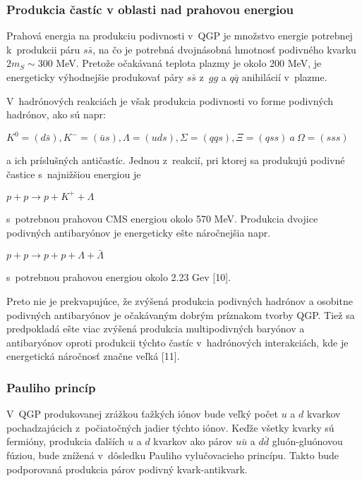 \subsubsection{Produkcia častíc v oblasti nad prahovou energiou}
Prahová energia na produkciu podivnosti v~QGP je množstvo
energie potrebnej k~produkcii páru $s\bar{s}$, na čo je potrebná
dvojnásobná  hmotnosť podivného kvarku $2m_{S} \sim 300$ MeV.
Pretože očakávaná teplota plazmy je okolo 200 MeV, je
energeticky výhodnejšie produkovať páry $s\bar{s}$ z~$gg$ a
$q\bar{q}$ anihilácií v~plazme.

V~hadrónových reakciách je však produkcia podivnosti vo forme
podivných hadrónov, ako sú napr:
\begin{center}
  $ K^{0}=(d\bar{s}), K^{-}=(\bar{u}s), \Lambda=(uds), \Sigma=(qqs),
  \Xi=(qss) \: a \: \Omega=(sss)$
\end{center}
a ich  príslušných antičastíc. Jednou z~reakcií, pri
ktorej sa
pro\-du\-ku\-jú po\-di\-vné častice s~najnižšiou energiou
je
\begin{center}
  $p + p \longrightarrow p + K^{+} + \Lambda$
\end{center}
s~potrebnou prahovou CMS energiou okolo 570 MeV. Produkcia dvojice
podivných anti\-ba\-ryónov je energeticky ešte
náročnejšia napr.
\begin{center}
  $p + p \longrightarrow p + p + \Lambda + \bar{\Lambda}$
\end{center}
s~potrebnou prahovou energiou okolo 2.23 Gev [10].

Preto nie je prekvapujúce, že zvýšená produkcia podivných
hadrónov a osobitne podivných antibaryónov je očakávaným
dobrým príznakom tvorby QGP. Tiež sa predpokladá ešte viac
zvýšená produkcia multipodivných baryónov a antibaryónov oproti
produkcii týchto častíc v~hadrónových interakciách, kde je
energetická náročnosť značne veľká [11].

\subsubsection{Pauliho princíp}
V~QGP produkovanej zrážkou ťažkých iónov bude
veľký počet $u$ a $d$ kvarkov pochadzajúcich
z~počiatočných jadier týchto iónov. Keďže všetky kvarky sú
fermióny, produkcia ďalších $u$ a $d$ kvarkov ako párov
$u\bar{u}$ a $d\bar{d}$ gluón-gluónovou fúziou, bude znížená
v~dôsledku Pauliho vylučovacieho princípu. Takto bude
podporovaná produkcia párov podivný kvark-antikvark.

